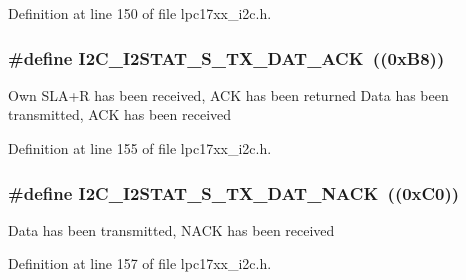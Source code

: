 \-Definition at line 150 of file lpc17xx\-\_\-i2c.\-h.

\hypertarget{group___i2_c___private___macros_gaeb92fe85cc3f6c813cb91685234ac08c}{
\subsubsection[{\-I2\-C\-\_\-\-I2\-S\-T\-A\-T\-\_\-\-S\-\_\-\-T\-X\-\_\-\-D\-A\-T\-\_\-\-A\-C\-K}]{\setlength{\rightskip}{0pt plus 5cm}\#define {\bf \-I2\-C\-\_\-\-I2\-S\-T\-A\-T\-\_\-\-S\-\_\-\-T\-X\-\_\-\-D\-A\-T\-\_\-\-A\-C\-K}~((0x\-B8))}}\label{group___i2_c___private___macros_gaeb92fe85cc3f6c813cb91685234ac08c}
\-Own \-S\-L\-A+\-R has been received, \-A\-C\-K has been returned \-Data has been transmitted, \-A\-C\-K has been received 

\-Definition at line 155 of file lpc17xx\-\_\-i2c.\-h.

\hypertarget{group___i2_c___private___macros_gad9cdcd8c06924252a2ad9baced97d838}{
\subsubsection[{\-I2\-C\-\_\-\-I2\-S\-T\-A\-T\-\_\-\-S\-\_\-\-T\-X\-\_\-\-D\-A\-T\-\_\-\-N\-A\-C\-K}]{\setlength{\rightskip}{0pt plus 5cm}\#define {\bf \-I2\-C\-\_\-\-I2\-S\-T\-A\-T\-\_\-\-S\-\_\-\-T\-X\-\_\-\-D\-A\-T\-\_\-\-N\-A\-C\-K}~((0x\-C0))}}\label{group___i2_c___private___macros_gad9cdcd8c06924252a2ad9baced97d838}
\-Data has been transmitted, \-N\-A\-C\-K has been received 

\-Definition at line 157 of file lpc17xx\-\_\-i2c.\-h.

